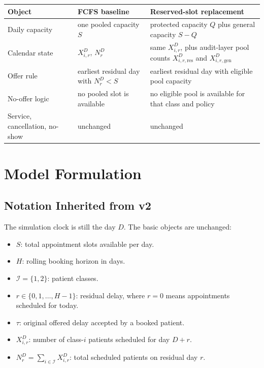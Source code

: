 \documentclass[11pt]{article}
\begin{document}
\begin{center}
\small
\begin{tabular}{L{0.27\textwidth} L{0.30\textwidth} L{0.33\textwidth}}
\toprule
\textbf{Object} & \textbf{FCFS baseline} & \textbf{Reserved-slot replacement} \\
\midrule
Daily capacity & one pooled capacity \(S\) & protected capacity \(Q\) plus general capacity \(S-Q\) \\
\addlinespace
Calendar state & \(X_{i,r}^{D}\), \(N_r^D\) & same \(X_{i,r}^{D}\), plus audit-layer pool counts \(X_{i,r,\mathrm{res}}^{D}\) and \(X_{i,r,\mathrm{gen}}^{D}\) \\
\addlinespace
Offer rule & earliest residual day with \(N_r^D<S\) & earliest residual day with eligible pool capacity \\
\addlinespace
No-offer logic & no pooled slot is available & no eligible pool is available for that class and policy \\
\addlinespace
Service, cancellation, no-show & unchanged & unchanged \\
\bottomrule
\end{tabular}
\normalsize
\end{center}

\section{Model Formulation}

\subsection{Notation Inherited from v2}

The simulation clock is still the day \(D\). The basic objects are unchanged:
\begin{itemize}[nosep]
    \item \(S\): total appointment slots available per day.
    \item \(H\): rolling booking horizon in days.
    \item \(\mathcal I=\{1,2\}\): patient classes.
    \item \(r\in\{0,1,\dots,H-1\}\): residual delay, where \(r=0\) means appointments scheduled for today.
    \item \(\tau\): original offered delay accepted by a booked patient.
    \item \(X_{i,r}^{D}\): number of class-\(i\) patients scheduled for day \(D+r\).
    \item \(N_r^D=\sum_{i\in\mathcal I}X_{i,r}^{D}\): total scheduled patients on residual day \(r\).
\end{itemize}
\end{document}
